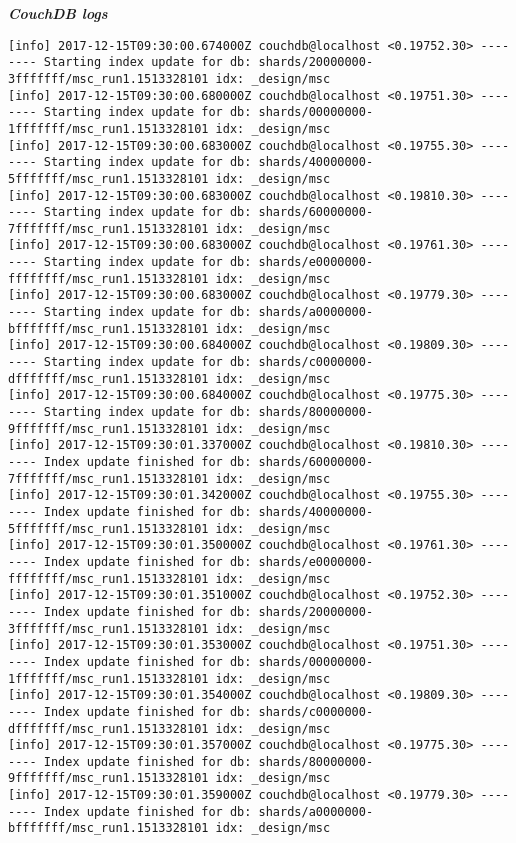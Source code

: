 \textit{\textbf{CouchDB logs}}
\begin{verbatim}
[info] 2017-12-15T09:30:00.674000Z couchdb@localhost <0.19752.30> -------- Starting index update for db: shards/20000000-3fffffff/msc_run1.1513328101 idx: _design/msc
[info] 2017-12-15T09:30:00.680000Z couchdb@localhost <0.19751.30> -------- Starting index update for db: shards/00000000-1fffffff/msc_run1.1513328101 idx: _design/msc
[info] 2017-12-15T09:30:00.683000Z couchdb@localhost <0.19755.30> -------- Starting index update for db: shards/40000000-5fffffff/msc_run1.1513328101 idx: _design/msc
[info] 2017-12-15T09:30:00.683000Z couchdb@localhost <0.19810.30> -------- Starting index update for db: shards/60000000-7fffffff/msc_run1.1513328101 idx: _design/msc
[info] 2017-12-15T09:30:00.683000Z couchdb@localhost <0.19761.30> -------- Starting index update for db: shards/e0000000-ffffffff/msc_run1.1513328101 idx: _design/msc
[info] 2017-12-15T09:30:00.683000Z couchdb@localhost <0.19779.30> -------- Starting index update for db: shards/a0000000-bfffffff/msc_run1.1513328101 idx: _design/msc
[info] 2017-12-15T09:30:00.684000Z couchdb@localhost <0.19809.30> -------- Starting index update for db: shards/c0000000-dfffffff/msc_run1.1513328101 idx: _design/msc
[info] 2017-12-15T09:30:00.684000Z couchdb@localhost <0.19775.30> -------- Starting index update for db: shards/80000000-9fffffff/msc_run1.1513328101 idx: _design/msc
[info] 2017-12-15T09:30:01.337000Z couchdb@localhost <0.19810.30> -------- Index update finished for db: shards/60000000-7fffffff/msc_run1.1513328101 idx: _design/msc
[info] 2017-12-15T09:30:01.342000Z couchdb@localhost <0.19755.30> -------- Index update finished for db: shards/40000000-5fffffff/msc_run1.1513328101 idx: _design/msc
[info] 2017-12-15T09:30:01.350000Z couchdb@localhost <0.19761.30> -------- Index update finished for db: shards/e0000000-ffffffff/msc_run1.1513328101 idx: _design/msc
[info] 2017-12-15T09:30:01.351000Z couchdb@localhost <0.19752.30> -------- Index update finished for db: shards/20000000-3fffffff/msc_run1.1513328101 idx: _design/msc
[info] 2017-12-15T09:30:01.353000Z couchdb@localhost <0.19751.30> -------- Index update finished for db: shards/00000000-1fffffff/msc_run1.1513328101 idx: _design/msc
[info] 2017-12-15T09:30:01.354000Z couchdb@localhost <0.19809.30> -------- Index update finished for db: shards/c0000000-dfffffff/msc_run1.1513328101 idx: _design/msc
[info] 2017-12-15T09:30:01.357000Z couchdb@localhost <0.19775.30> -------- Index update finished for db: shards/80000000-9fffffff/msc_run1.1513328101 idx: _design/msc
[info] 2017-12-15T09:30:01.359000Z couchdb@localhost <0.19779.30> -------- Index update finished for db: shards/a0000000-bfffffff/msc_run1.1513328101 idx: _design/msc
\end{verbatim}

